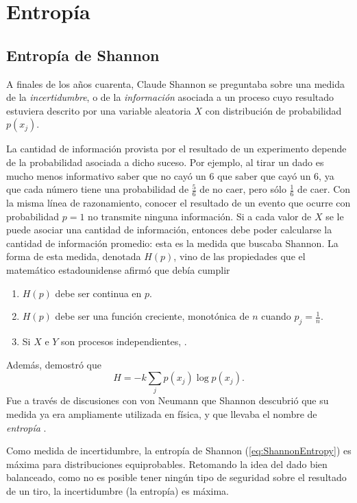 \section{Entropía}
\subsection{Entropía de Shannon}
A finales de los años cuarenta, Claude Shannon se preguntaba sobre una medida de la \textit{incertidumbre}, o de la \textit{información} asociada a un proceso cuyo resultado estuviera descrito por una variable aleatoria $X$ con distribución de probabilidad $p(x_{j})$.


La cantidad de información provista por el resultado de un experimento depende de la probabilidad asociada a dicho suceso. Por ejemplo, al tirar un dado es mucho menos informativo saber que no cayó un $6$ que saber que cayó un $6$, ya que cada número tiene una probabilidad de $\frac{5}{6}$ de no caer, pero sólo $\frac{1}{6}$ de caer. Con la misma línea de razonamiento, conocer el resultado de un evento que ocurre con probabilidad $p=1$ no transmite ninguna información. Si a cada valor de $X$ se le puede asociar una cantidad de información, entonces debe poder calcularse la cantidad de información promedio: esta es la medida que buscaba Shannon. La forma de esta medida, denotada $H(p)$, vino de las propiedades que el matemático estadounidense afirmó que debía cumplir \cite{Shannon,Wilde}
\begin{enumerate}
    \item $H(p)$ debe ser continua en $p$.
    \item $H(p)$ debe ser una función creciente, monotónica de $n$ cuando $p_{j}=\frac{1}{n}$.
    \item Si $X$ e $Y$ son procesos independientes, .
\end{enumerate}
Además, demostró que
\begin{equation}\label{eq:ShannonEntropy}
    H=-k\sum_{j}p(x_{j})\log{p(x_{j})}.
\end{equation}
Fue a través de discusiones con von Neumann que Shannon descubrió que su medida ya era ampliamente utilizada en física, y que llevaba el nombre de \textit{entropía} \cite{McIrvine}.

Como medida de incertidumbre, la entropía de Shannon (\ref{eq:ShannonEntropy}) es máxima para distribuciones equiprobables. Retomando la idea del dado bien balanceado, como no es posible tener ningún tipo de seguridad sobre el resultado de un tiro, la incertidumbre (la entropía) es máxima.

